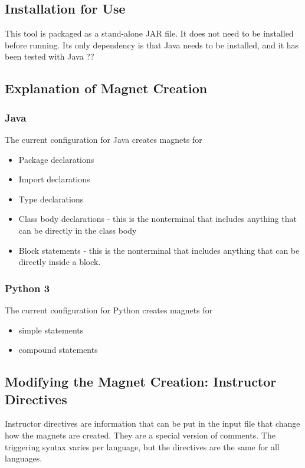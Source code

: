 \documentclass[letter,10pt]{article}
\begin{document}
\subsection{Installation for Use}
This tool is packaged as a stand-alone JAR file. It does not need to be 
installed before running. Its only dependency is that Java needs to be 
installed, and it has been tested with Java ?? 

\subsection{Explanation of Magnet Creation}


\subsubsection{Java}
The current configuration for Java creates magnets for
\begin{itemize}
 \item Package declarations
 \item Import declarations
 \item Type declarations
 \item Class body declarations - this is the nonterminal that includes 
anything that can be directly in the class body
 \item Block statements - this is the nonterminal that includes 
anything that can be directly inside a block.
\end{itemize}

\subsubsection{Python 3}
The current configuration for Python creates magnets for
\begin{itemize}
 \item simple statements
 \item compound statements
\end{itemize}


\subsection{Modifying the Magnet Creation: Instructor Directives}
Instructor directives are information that can be put in the input file 
that change how the magnets are created. They are a special version of 
comments. The triggering syntax varies per language, but the directives 
are the same for all languages.
\end{document}
